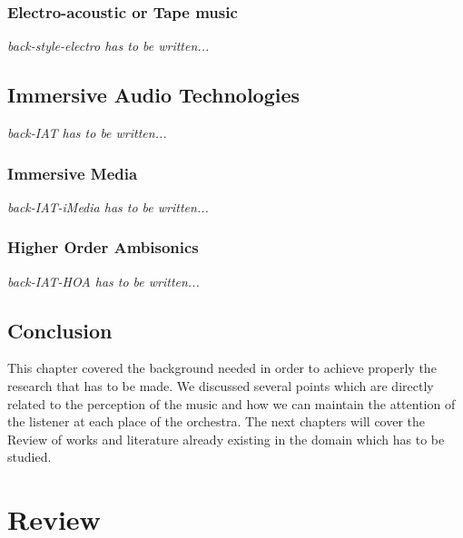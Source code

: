 \documentclass[letterpaper, openright]{report}
\begin{document}
			\subsection{Electro-acoustic or Tape music} %
			\label{subsub:back-style-electro}
\textit{back-style-electro has to be written...}
    
    \section{Immersive Audio Technologies} %
	\label{sub:back-IAT}
\textit{back-IAT has to be written...}

			\subsection{Immersive Media} %
			\label{subsub:back-IAT-iMedia}
\textit{back-IAT-iMedia has to be written...}

			\subsection{Higher Order Ambisonics} %
			\label{subsub:back-IAT-HOA}
\textit{back-IAT-HOA has to be written...}

    
    \section{Conclusion} %
	\label{sub:back-conclusion}
This chapter covered the background needed in order to achieve properly the research that has to be made.  We discussed several points which are directly related to the perception of the music and how we can maintain the attention of the listener at each place of the orchestra.\newline
The next chapters will cover the Review of works and literature already existing in the domain which has to be studied.

	\vspace{0.5cm}
   

\newpage
	\newpage
\chapter{Review} %
\label{sec:review}
\end{document}
